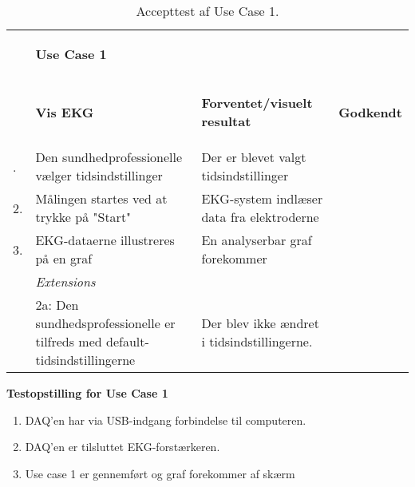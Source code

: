 \begin{table}[H]
    \begin{tabularx}{\textwidth}{l X X c}
     \toprule
     ~ & \begin{large}\textbf{Use Case 1} \end{large} & ~ & ~ \\  
     ~ & \begin{large}\textbf{Vis EKG} \end{large}	  
     & \begin{large} \textbf{Forventet/visuelt resultat}\end{large} 
     & \begin{large} \textbf{Godkendt} \end{large}      
     \\     	 \midrule \addlinespace[3mm]                                                                                                                                                                             					    
                         1. &  Den sundhedprofessionelle vælger tidsindstillinger
     					    &  Der er blevet valgt tidsindstillinger 
     					    &  %
     					    \\ \midrule  
     					 2. &  Målingen startes ved at trykke på "Start"
     					    &  EKG-system indlæser data fra elektroderne
     					    &  %
     					    \\ \midrule
     					 3. &  EKG-dataerne illustreres på en graf 
     					    &  En analyserbar graf forekommer
     					    &  %
     					    \\ \midrule   
                         ~  &  \textit{Extensions}
     					    &  ~  
     					    &  ~         \\	\midrule
                         ~  &  2a: Den sundhedsprofessionelle er tilfreds med default-tidsindstillingerne
     					    &  Der blev ikke ændret i tidsindstillingerne. 
     					    &  %
     					    \\
    					         					         	
	\bottomrule   
    \end{tabularx}
    \caption {Accepttest af Use Case 1.}
    \label{tab:AT_UC1}
\end{table}


\textbf{Testopstilling for Use Case 1}
\begin{enumerate}
	\item DAQ’en har via USB-indgang forbindelse til computeren.
	\item DAQ’en er tilsluttet EKG-forstærkeren.
	\item Use case 1 er gennemført og graf forekommer af skærm
\end{enumerate}

